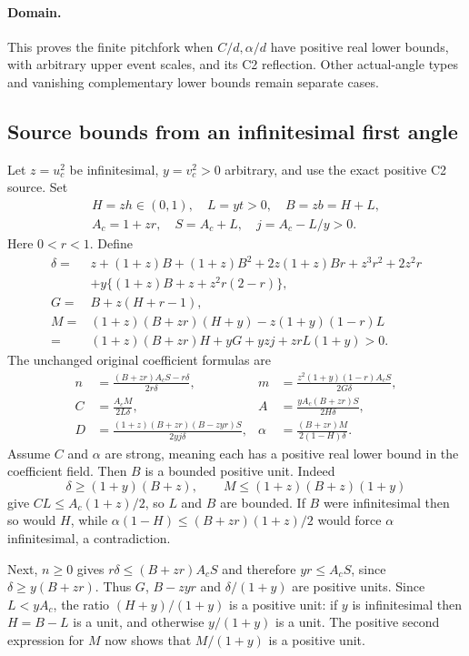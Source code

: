 \paragraph{Domain.}
This proves the finite pitchfork when $C/d,\alpha/d$ have positive real
lower bounds, with arbitrary upper event scales, and its C2 reflection.
Other actual-angle types and vanishing complementary lower bounds remain
separate cases.

\subsection{Source bounds from an infinitesimal first angle}
\label{component:pf5726218aec8}

\label{pf5726218aec8:sec:strong-angle-entry}
Let $z=u_c^2$ be infinitesimal, $y=v_c^2>0$ arbitrary, and use the exact
positive C2 source. Set
\[
 \begin{gathered}
 H=zh\in(0,1),\quad L=yt>0,\quad B=zb=H+L,\\
 A_c=1+zr,\quad S=A_c+L,\quad j=A_c-L/y>0.
 \end{gathered}
\]
Here $0<r<1$. Define
\begin{align*}
 \delta={}&z+(1+z)B+(1+z)B^2+2z(1+z)Br+z^3r^2+2z^2r\\
 &+y\{(1+z)B+z+z^2r(2-r)\},\\
 G={}&B+z(H+r-1),\\
 M={}&(1+z)(B+zr)(H+y)-z(1+y)(1-r)L\\
 ={}&(1+z)(B+zr)H+yG+yzj+zrL(1+y)>0.
\end{align*}
The unchanged original coefficient formulas are
\begin{align*}
 n&=\frac{(B+zr)A_cS-r\delta}{2r\delta},&
 m&=\frac{z^2(1+y)(1-r)A_cS}{2G\delta},\\
 C&=\frac{A_cM}{2L\delta},&
 A&=\frac{yA_c(B+zr)S}{2H\delta},\\
 D&=\frac{(1+z)(B+zr)(B-zyr)S}{2yj\delta},&
 \alpha&=\frac{(B+zr)M}{2(1-H)\delta}.
\tag{GE1}
\end{align*}
Assume $C$ and $\alpha$ are strong, meaning each has a positive real
lower bound in the coefficient field. Then $B$ is a bounded positive
unit. Indeed
\[
 \delta\ge(1+y)(B+z),\qquad
 M\le(1+z)(B+z)(1+y)
\]
give $CL\le A_c(1+z)/2$, so $L$ and $B$ are bounded.
If $B$ were infinitesimal then so would $H$, while
$\alpha(1-H)\le(B+zr)(1+z)/2$ would force $\alpha$ infinitesimal,
a contradiction.

Next, $n\ge0$ gives $r\delta\le(B+zr)A_cS$ and therefore
$yr\le A_cS$, since $\delta\ge y(B+zr)$.
Thus $G$, $B-zyr$ and $\delta/(1+y)$ are positive units.
Since $L<yA_c$, the ratio $(H+y)/(1+y)$ is a positive unit: if $y$
is infinitesimal then $H=B-L$ is a unit, and otherwise $y/(1+y)$
is a unit. The positive second expression for $M$ now shows that
$M/(1+y)$ is a positive unit.

